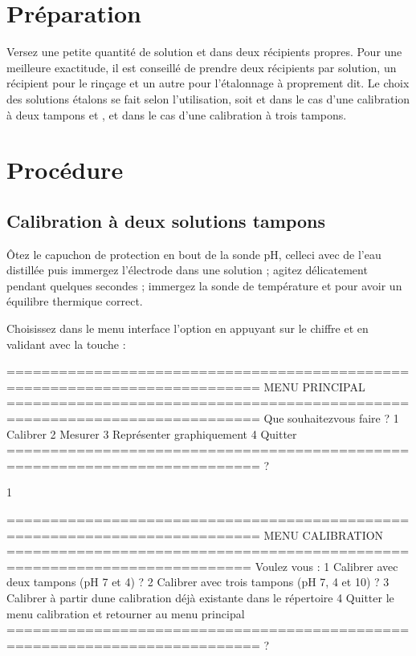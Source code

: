 \documentclass[letterpaper,10pt,french]{sphinxmanual}
\begin{document}
\section{Préparation}
\label{\detokenize{calib:preparation}}
\sphinxAtStartPar
Versez une petite quantité de solution  et  dans deux récipients propres. Pour une
meilleure exactitude, il est conseillé de prendre deux récipients par solution, un récipient pour le rinçage et un autre pour
l’étalonnage à proprement dit. Le choix des solutions étalons se fait selon l’utilisation, soit  et
 dans le cas d’une calibration à deux tampons et ,  et  dans le cas d’une
calibration à trois tampons.


\section{Procédure}
\label{\detokenize{calib:procedure}}

\subsection{Calibration à deux solutions tampons}
\label{\detokenize{calib:calibration-a-deux-solutions-tampons}}
\sphinxAtStartPar
Ôtez le capuchon de protection en bout de la sonde pH,  celle\sphinxhyphen{}ci avec de l’eau distillée puis immergez l’électrode
dans une solution  ; agitez délicatement pendant quelques secondes ; immergez la sonde de température
et  pour avoir un équilibre thermique correct.

\sphinxAtStartPar
Choisissez dans le menu interface l’option  en appuyant sur le chiffre  et en validant avec
la touche :

\begin{sphinxVerbatim}[commandchars=\\\{\}]
===========================================================================
MENU PRINCIPAL
===========================================================================
Que souhaitez\PYGZhy{}vous faire ?
1 \PYGZhy{} Calibrer
2 \PYGZhy{} Mesurer
3 \PYGZhy{} Représenter graphiquement
4 \PYGZhy{} Quitter
===========================================================================
?

\PYGZhy{}\PYGZgt{} 1

    ===========================================================================
    MENU CALIBRATION
    ==========================================================================
    Voulez \PYGZhy{} vous :
    1 \PYGZhy{} Calibrer avec deux tampons (pH 7 et 4) ?
    2 \PYGZhy{} Calibrer avec trois tampons (pH 7, 4 et 10) ?
    3 \PYGZhy{} Calibrer à partir d\PYGZsq{}une calibration déjà existante dans le répertoire
    4 \PYGZhy{} Quitter le menu calibration et retourner au menu principal
    ===========================================================================
    ?
\end{sphinxVerbatim}
\end{document}
